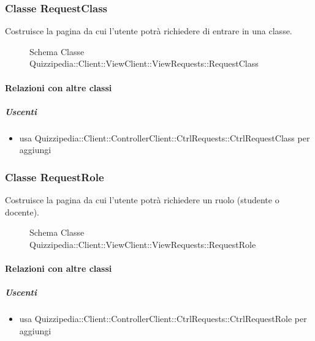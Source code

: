 \subsubsection{Classe RequestClass}
Costruisce la pagina da cui l'utente potrà richiedere di entrare in una classe.
\begin{figure}[H]
\centering
\noindent{}
\caption[Schema Classe RequestClass]{Schema Classe Quizzipedia::Client::ViewClient::ViewRequests::RequestClass}
\end{figure}
\paragraph{Relazioni con altre classi}
\subparagraph{Uscenti}
\begin{itemize}
\item usa Quizzipedia::Client::ControllerClient::CtrlRequests::CtrlRequestClass per aggiungi
\end{itemize}
\subsubsection{Classe RequestRole}
Costruisce la pagina da cui l'utente potrà richiedere un ruolo (studente o docente).
\begin{figure}[H]
\centering
\noindent{}
\caption[Schema Classe RequestRole]{Schema Classe Quizzipedia::Client::ViewClient::ViewRequests::RequestRole}
\end{figure}
\paragraph{Relazioni con altre classi}
\subparagraph{Uscenti}
\begin{itemize}
\item usa Quizzipedia::Client::ControllerClient::CtrlRequests::CtrlRequestRole per aggiungi
\end{itemize}
